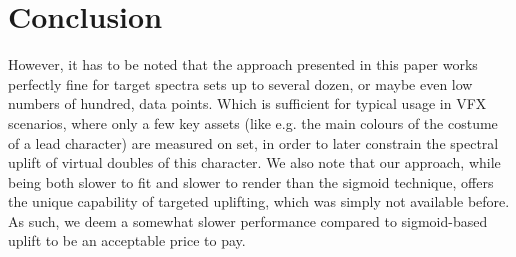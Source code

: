 \chapter*{Conclusion}


However, it has to be noted that the approach presented in this paper works perfectly fine for target spectra sets up to several dozen, or maybe even low numbers of hundred, data points. Which is sufficient for typical usage in VFX scenarios, where only a few key assets (like e.g. the main colours of the costume of a lead character) are measured on set, in order to later constrain the spectral uplift of virtual doubles of this character.
We also note that our approach, while being both slower to fit and slower to render than the sigmoid technique, offers the unique capability of targeted uplifting, which was simply not available before. As such, we deem a somewhat slower performance compared to sigmoid-based uplift to be an acceptable price to pay.